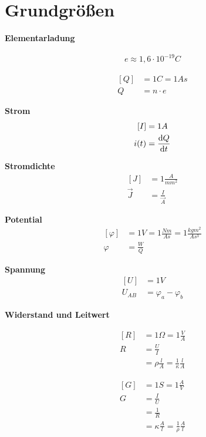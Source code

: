 \section{Grundgrößen}

\textbf{Elementarladung}
\begin{multicols}{2}{}
\begin{align*}
e\approx 1,6\cdot 10^{-19}C
\end{align*}
\hfill

\begin{align*}
\left[Q\right]&=1C=1As\\
Q&=n\cdot e
\end{align*}
\end{multicols}


\begin{multicols}{2}{}
\textbf{Strom}
\begin{align*}
\left[I\right]&=1A\\
i(t)&=\frac{\mathop{}\!\mathrm{d} Q}{\mathop{}\!\mathrm{d} t}
\end{align*}

\textbf{Stromdichte}
\begin{align*}
\left[J\right]&=1\frac{A}{mm^2}\\
\vec{J}&=\frac{I}{\vec{A}}
\end{align*}
\end{multicols}


\begin{multicols}{2}{}
\textbf{Potential}
\begin{align*}
\left[\varphi\right]&=1V=1\frac{Nm}{As}=1\frac{kgm^2}{As^3}\\
\varphi&=\frac{W}{Q}
\end{align*}

\textbf{Spannung}
\begin{align*}
\left[U\right]&=1V\\
U_{AB}&=\varphi_a-\varphi_b
\end{align*}
\hfill
\end{multicols}

\newpage
\textbf{Widerstand und Leitwert}
\begin{multicols}{2}{}
\begin{align*}
\left[R\right]&=1\Omega=1\frac{V}{A}\\
R&=\frac{U}{I}\\
&=\rho\frac{l}{A}=\frac{1}{\kappa}\frac{l}{A}
\end{align*}
\hfill

\begin{align*}
\left[G\right]&=1S=1\frac{A}{V}\\
G&=\frac{I}{U}\\
&=\frac{1}{R}\\
&=\kappa\frac{A}{l}=\frac{1}{\rho}\frac{A}{l}
\end{align*}
\end{multicols}


